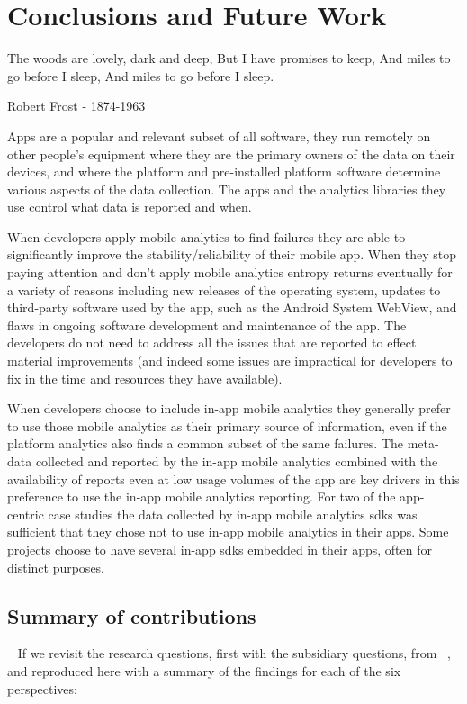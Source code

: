 \setchapterpreamble[u]{\margintoc}
\chapter{Conclusions and Future Work}\label{chapter-conclusions-and-future-work}

\epigraph{The woods are lovely, dark and deep,
But I have promises to keep,   
And miles to go before I sleep,   
And miles to go before I sleep.}{Robert Frost - 1874-1963}

Apps are a popular and relevant subset of all software, they run remotely on other people’s equipment where they are the primary owners of the data on their devices, and where the platform and pre-installed platform software determine various aspects of the data collection. The apps and the analytics libraries they use control what data is reported and when. 

When developers apply mobile analytics to find failures they are able to significantly improve the stability/reliability of their mobile app. When they stop paying attention and don't apply mobile analytics entropy returns eventually for a variety of reasons including new releases of the operating system, updates to third-party software used by the app, such as the Android System WebView, and flaws in ongoing software development and maintenance of the app. The developers do not need to address all the issues that are reported to effect material improvements (and indeed some issues are impractical for developers to fix in the time and resources they have available).

When developers choose to include in-app mobile analytics they generally prefer to use those mobile analytics as their primary source of information, even if the platform analytics also finds a common subset of the same failures. The meta-data collected and reported by the in-app mobile analytics combined with the availability of reports even at low usage volumes of the app are key drivers in this preference to use the in-app mobile analytics reporting. For two of the app-centric case studies the data collected by in-app mobile analytics \Glspl{sdk} was sufficient that they chose not to use in-app mobile analytics in their apps. Some projects choose to have several in-app \Glspl{sdk} embedded in their apps, often for distinct purposes.


\section{Summary of contributions}~\label{conclusions-summary-of-contributions}
If we revisit the research questions, first with the subsidiary questions, from ~, and reproduced here with a summary of the findings for each of the six perspectives: 

